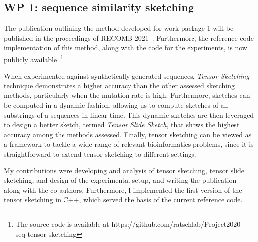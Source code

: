 

\subsection{WP 1: sequence similarity sketching}
The publication outlining the method developed for work package 1 will be published in the proceedings of RECOMB 2021~\cite{joudaki2020fast}. Furthermore, the reference code implementation of this method, along with the code for the experiments, is now publicly available~\footnote{The source code is available at https://github.com/ratschlab/Project2020-seq-tensor-sketching}. 

When experimented against synthetically generated sequences, \emph{Tensor Sketching} technique demonstrates a higher accuracy than the other assessed sketching methods, particularly when the mutation rate is high. Furthermore, sketches can be computed in a dynamic fashion, allowing us to compute sketches of all substrings of a sequences in linear time. This dynamic sketches are then leveraged to design a better sketch, termed \emph{Tensor Slide Sketch}, that shows the highest accuracy among the methods assessed. Finally, tensor sketching can be viewed as a framework to tackle a wide range of relevant bioinformatics problems, since it is straightforward to extend tensor sketching to different settings.

My contributions were developing and analysis of tensor sketching, tensor slide sketching, and design of the experimental setup, and writing the publication along with the co-authors. Furthermore, I implemented the first version of the tensor sketching in C++, which served the basis of the current reference code.

